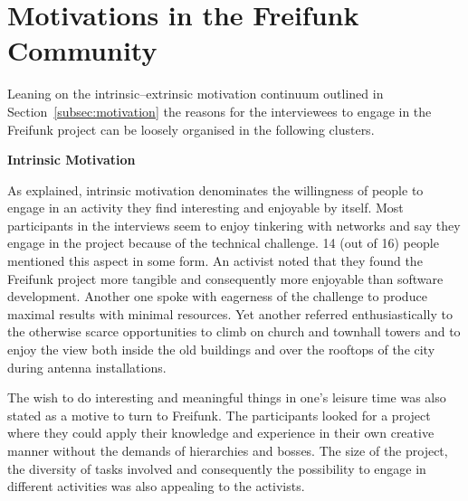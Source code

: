 \section{Motivations in the Freifunk Community}

\begin{comment}
\begin{itemize}
  \item is the focus of the paper;
  \item only pull up the foss motivations as comparison to underline similarities and differences with the foundings here
  \item general part of the questionnaire $\rightarrow$ cluster answers
  \item some graphs/tables on the specific questions
\end{itemize}
\end{comment}

Leaning on the intrinsic--extrinsic motivation continuum outlined in Section~\ref{subsec:motivation} the reasons for the interviewees to engage in the Freifunk project can be loosely organised in the following clusters.

\textbf{Intrinsic Motivation}

As explained, intrinsic motivation denominates the willingness of people to engage in an activity they find interesting and enjoyable by itself.
Most participants in the interviews seem to enjoy tinkering with networks and say they engage in the project because of the technical challenge.
14 (out of 16) people mentioned this aspect in some form.
An activist noted that they found the Freifunk project more tangible and consequently more enjoyable than software development.
Another one spoke with eagerness of the challenge to produce maximal results with minimal resources.
Yet another referred enthusiastically to the otherwise scarce opportunities to climb on church and townhall towers and to enjoy the view both inside the old buildings and over the rooftops of the city during antenna installations.

The wish to do interesting and meaningful things in one's leisure time was also stated as a motive to turn to Freifunk.
The participants looked for a project where they could apply their knowledge and experience in their own creative manner without the demands of hierarchies and bosses.
The size of the project, the diversity of tasks involved and consequently the possibility to engage in different activities was also appealing to the activists.

